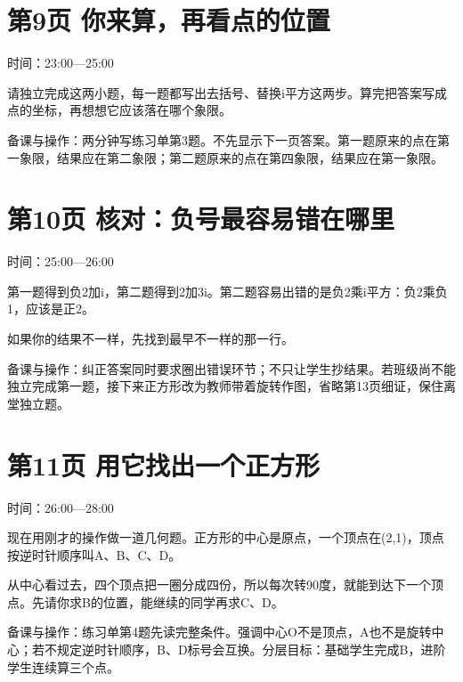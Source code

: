 \documentclass[UTF8,a4paper,11pt,fontset=fandol]{ctexart}
\begin{document}
\par\noindent\begin{minipage}{\linewidth}

\section*{第9页 你来算，再看点的位置}

时间：23:00—25:00

请独立完成这两小题，每一题都写出去括号、替换i平方这两步。算完把答案写成点的坐标，再想想它应该落在哪个象限。

{\small\color{black!65}备课与操作：两分钟写练习单第3题。不先显示下一页答案。第一题原来的点在第一象限，结果应在第二象限；第二题原来的点在第四象限，结果应在第一象限。}

\end{minipage}\par\vspace{3mm}

\par\noindent\begin{minipage}{\linewidth}

\section*{第10页 核对：负号最容易错在哪里}

时间：25:00—26:00

第一题得到负2加i，第二题得到2加3i。第二题容易出错的是负2乘i平方：负2乘负1，应该是正2。

如果你的结果不一样，先找到最早不一样的那一行。

{\small\color{black!65}备课与操作：纠正答案同时要求圈出错误环节；不只让学生抄结果。若班级尚不能独立完成第一题，接下来正方形改为教师带着旋转作图，省略第13页细证，保住离堂独立题。}

\end{minipage}\par\vspace{3mm}

\par\noindent\begin{minipage}{\linewidth}

\section*{第11页 用它找出一个正方形}

时间：26:00—28:00

现在用刚才的操作做一道几何题。正方形的中心是原点，一个顶点在(2,1)，顶点按逆时针顺序叫A、B、C、D。

从中心看过去，四个顶点把一圈分成四份，所以每次转90度，就能到达下一个顶点。先请你求B的位置，能继续的同学再求C、D。

{\small\color{black!65}备课与操作：练习单第4题先读完整条件。强调中心O不是顶点，A也不是旋转中心；若不规定逆时针顺序，B、D标号会互换。分层目标：基础学生完成B，进阶学生连续算三个点。}

\end{minipage}\par\vspace{3mm}
\end{document}
